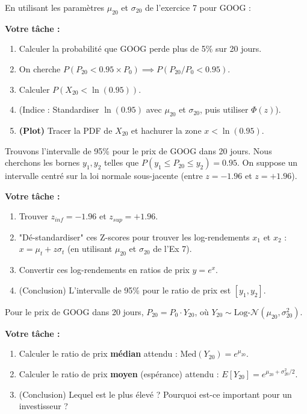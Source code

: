 \begin{exercicebox}
En utilisant les paramètres $\mu_{20}$ et $\sigma_{20}$ de l'exercice 7 pour GOOG :

\textbf{Votre tâche :}
\begin{enumerate}
    \item Calculer la probabilité que GOOG perde plus de 5\% sur 20 jours.
    \item On cherche $P(P_{20} < 0.95 \times P_0) \implies P(P_{20}/P_0 < 0.95)$.
    \item Calculer $P(X_{20} < \ln(0.95))$.
    \item (Indice : Standardiser $\ln(0.95)$ avec $\mu_{20}$ et $\sigma_{20}$, puis utiliser $\Phi(z)$).
    \item \textbf{(Plot)} Tracer la PDF de $X_{20}$ et hachurer la zone $x < \ln(0.95)$.
\end{enumerate}
\end{exercicebox}

\begin{exercicebox}
Trouvons l'intervalle de 95\% pour le prix de GOOG dans 20 jours.
Nous cherchons les bornes $y_1, y_2$ telles que $P(y_1 \le P_{20} \le y_2) = 0.95$.
On suppose un intervalle centré sur la loi normale sous-jacente (entre $z=-1.96$ et $z=+1.96$).

\textbf{Votre tâche :}
\begin{enumerate}
    \item Trouver $z_{inf} = -1.96$ et $z_{sup} = +1.96$.
    \item "Dé-standardiser" ces Z-scores pour trouver les log-rendements $x_1$ et $x_2$ :
        $x = \mu_t + z \sigma_t$ (en utilisant $\mu_{20}$ et $\sigma_{20}$ de l'Ex 7).
    \item Convertir ces log-rendements en ratios de prix $y = e^x$.
    \item (Conclusion) L'intervalle de 95\% pour le ratio de prix est $[y_1, y_2]$.
\end{enumerate}
\end{exercicebox}

\begin{exercicebox}
Pour le prix de GOOG dans 20 jours, $P_{20} = P_0 \cdot Y_{20}$, où $Y_{20} \sim \text{Log-}\mathcal{N}(\mu_{20}, \sigma_{20}^2)$.

\textbf{Votre tâche :}
\begin{enumerate}
    \item Calculer le ratio de prix \textbf{médian} attendu : $\text{Med}(Y_{20}) = e^{\mu_{20}}$.
    \item Calculer le ratio de prix \textbf{moyen} (espérance) attendu : $E[Y_{20}] = e^{\mu_{20} + \sigma_{20}^2 / 2}$.
    \item (Conclusion) Lequel est le plus élevé ? Pourquoi est-ce important pour un investisseur ?
\end{enumerate}
\end{exercicebox}